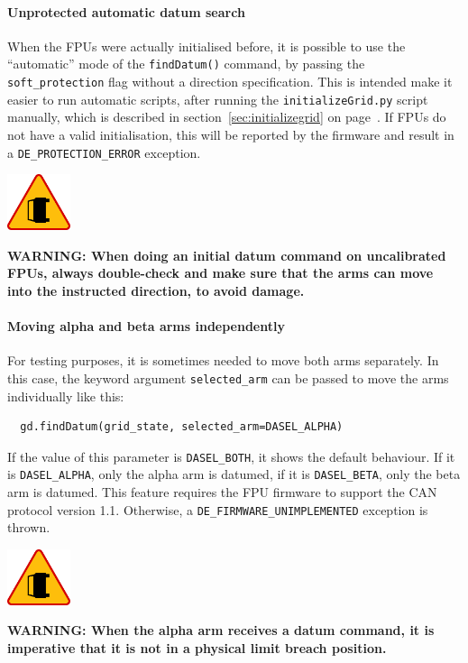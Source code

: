 \documentclass[11pt,a4paper]{scrartcl}
\newenvironment{warning}{\begin{framed}\includegraphics[width=5em]{accident-area-ahead.png}
}{\end{framed}}
\begin{document}
\paragraph{Unprotected automatic datum search}
 When the FPUs were
actually initialised before, it is possible to use the ``automatic''
mode of the \texttt{findDatum()} command, by passing the
\texttt{soft\_protection} flag without a direction specification.
This is intended make it easier to run automatic scripts, after
running the \texttt{initializeGrid.py} script manually, which is
described in section~\ref{sec:initializegrid} on
page~\pageref{sec:initializegrid}. If FPUs do not have a valid
initialisation, this will be reported by the firmware and result in a
\texttt{DE\_PROTECTION\_ERROR} exception.


\begin{warning}
  \textbf{WARNING: When doing an initial datum command on uncalibrated
    FPUs, always double-check and make sure that the arms can move
    into the instructed direction, to avoid damage.}
\end{warning}




\paragraph{Moving alpha and beta arms independently}

For testing purposes, it is sometimes needed to move both arms
separately.  In this case, the keyword argument
\texttt{selected\_arm} can be passed to move the arms individually
like this:

\begin{verbatim}
  gd.findDatum(grid_state, selected_arm=DASEL_ALPHA)
\end{verbatim}

\begin{sloppypar}
If the value of this parameter is \texttt{DASEL\_BOTH}, it shows the
default behaviour. If it is \texttt{DASEL\_ALPHA}, only the alpha arm
is datumed, if it is \texttt{DASEL\_BETA}, only the beta arm is
datumed. This feature requires the FPU firmware to support the CAN
protocol version 1.1. Otherwise, a
\texttt{DE\_FIRMWARE\_UNIMPLEMENTED} exception is thrown.
\end{sloppypar}

\begin{warning}
\textbf{WARNING: When the alpha arm receives a datum command, it is
  imperative that it is not in a physical limit breach position.}
\end{warning}
\end{document}
